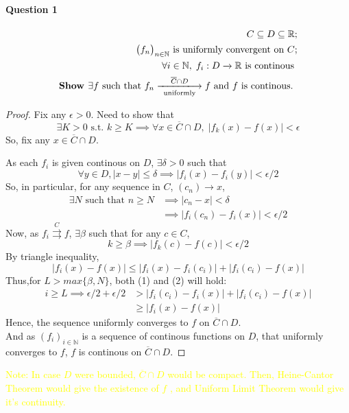\documentclass[20pt,a4paper]{extarticle} %
\begin{document}
\paragraph{Question 1} %
\begin{eqnarray*}
	C \subseteq D \subseteq \mathbb{R};\\
	\big(f _n\big)_{n \in \mathbb{N}} \text{ is uniformly convergent on } C ;\\
	\forall i \in \mathbb{N} , \; f_i : D \xrightarrow{} \mathbb{R} \text{ is continous }\\
	\textbf{Show } \exists f \text{ such that } f_n \xlongrightarrow [ \text{ uniformly }]{ \overline{C} \cap D } f
	\text{ and } f \text{ is continous. }
\end{eqnarray*}
\begin{proof}

	Fix any $\epsilon > 0$. Need to show that
	\[ \exists K >0 \text{ s.t. } k\geq K \implies \forall x \in \overline{C} \cap D, \;
	|f_k(x) - f(x) |< \epsilon\]
	So, fix any $x \in \overline{C} \cap D$.

	As each $f_i$ is given continous on $D$, $\exists \delta >0 $ such that
	\[ \forall y \in D, |x-y| \leq \delta \implies |f_i(x) - f_i(y)| < \epsilon/2 \]
	So, in particular, for any sequence in $C$, $(c_n) \rightarrow x$,
	\begin{align*}\label{eq:1}
		\exists N \text{ such that } n\geq N & \implies |c_n - x| < \delta \\
						     & \implies |f_i(c_n) - f_i(x)| < \epsilon/2
	\end{align*}
	Now, as $f_i \overset{C}{\rightrightarrows} f$, $\exists \beta$ such that for any $c \in C$,
	\begin{equation*}\label{eq:2}
		k \geq \beta \implies |f_k(c) - f(c)| < \epsilon/2
	\end{equation*}
	By triangle inequality,
	\[ |f_i(x) - f(x)| \leq |f_i(x) - f_i(c_i)| + |f_i(c_i) - f(x)|\]
	Thus,for $L > max\{ \beta , N \}$, both (1) and (2) will hold:
	\begin{align*}
		i \geq L \implies \epsilon/2 +\epsilon/2 &> |f_i(c_i) - f_i(x)|+ |f_i(c_i) - f(x)| \\
							 &\geq |f_i(x) - f(x) |
	\end{align*}
	Hence, the sequence uniformly converges to $f$ on $\overline{C}\cap D$.\\
	And as $(f_i)_{i \in \mathbb{N}}$ is a sequence of continous functions on $D$, that uniformly converges to $f$,
	$f$ is continous on $\overline{C}\cap D$.
\end{proof}
\textcolor{yellow}{Note: In case $D$ were bounded, $\overline{C} \cap D $ would be compact. Then, Heine-Cantor Theorem would give the existence of $f$ , and Uniform Limit Theorem would give it's continuity.   }
\end{document}
